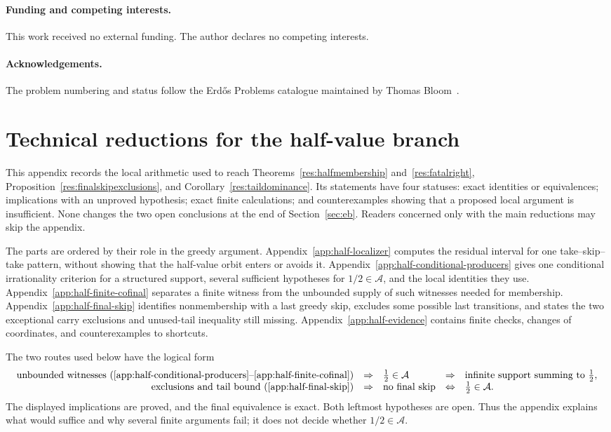 \documentclass[11pt]{article}
\theoremstyle{definition}
\theoremstyle{remark}
\begin{document}
\paragraph{Funding and competing interests.} This work received no external
funding. The author declares no competing interests.

\paragraph{Acknowledgements.} The problem numbering and status follow the
Erd\H{o}s Problems catalogue maintained by Thomas Bloom~\cite{erdosproblems}.

\appendix
\section{Technical reductions for the half-value branch}
\label{app:half-technical}

This appendix records the local arithmetic used to reach
Theorems~\ref{res:halfmembership} and~\ref{res:fatalright},
Proposition~\ref{res:finalskipexclusions}, and
Corollary~\ref{res:taildominance}.  Its statements have four statuses: exact
identities or equivalences; implications with an unproved hypothesis; exact
finite calculations; and counterexamples showing that a proposed local
argument is insufficient.  None changes the two open conclusions at the end
of Section~\ref{sec:eb}.  Readers concerned only with the main reductions may
skip the appendix.

The parts are ordered by their role in the greedy argument.
Appendix~\ref{app:half-localizer} computes the residual interval for one
take--skip--take pattern, without showing that the half-value orbit enters or
avoids it.  Appendix~\ref{app:half-conditional-producers} gives one
conditional irrationality criterion for a structured support, several
sufficient hypotheses for \(1/2\in\mathcal A\), and the local identities they
use.  Appendix~\ref{app:half-finite-cofinal} separates a finite witness from
the unbounded supply of such witnesses needed for membership.
Appendix~\ref{app:half-final-skip} identifies nonmembership with a last greedy
skip, excludes some possible last transitions, and states the two exceptional
carry exclusions and unused-tail inequality still missing.  Appendix~\ref{app:half-evidence}
contains finite checks, changes of coordinates, and counterexamples to
shortcuts.

The two routes used below have the logical form
{\setlength{\arraycolsep}{3pt}
\[
\begin{array}{rclcl}
\text{unbounded witnesses (\ref{app:half-conditional-producers}--\ref{app:half-finite-cofinal})}
&\Rightarrow& \frac12\in\mathcal A
&\Rightarrow& \text{infinite support summing to }\frac12,\\
\text{exclusions and tail bound (\ref{app:half-final-skip})}
&\Rightarrow& \text{no final skip}
 &\Leftrightarrow& \frac12\in\mathcal A.
\end{array}
\]
}
The displayed implications are proved, and the final equivalence is exact.
Both leftmost hypotheses are open.  Thus the appendix explains what would
suffice and why several finite arguments fail; it does not decide whether
\(1/2\in\mathcal A\).
\end{document}
